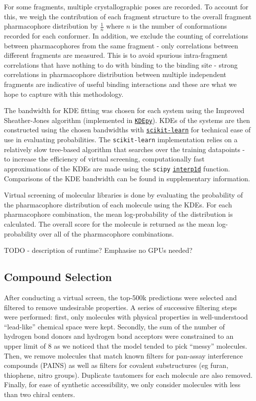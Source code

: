 \documentclass[journal=jacsat,manuscript=article]{achemso}
\begin{document}
For some fragments, multiple crystallographic poses are recorded. To account for this, we weigh the contribution of each fragment structure to the overall fragment pharmacophore distribution by $\frac{1}{n}$ where $n$ is the number of conformations recorded for each conformer. In addition, we exclude the counting of correlations between pharmacophores from the same fragment - only correlations between different fragments are measured. This is to avoid spurious intra-fragment correlations that have nothing to do with binding to the binding site - strong correlations in pharmacophore distribution between multiple independent fragments are indicative of useful binding interactions and these are what we hope to capture with this methodology.

The bandwidth for KDE fitting was chosen for each system using the Improved Sheather-Jones algorithm \cite{Botev2010ISJ} (implemented in \href{https://kdepy.readthedocs.io/en/latest/index.html}{\texttt{KDEpy}}). KDEs of the systems are then constructed using the chosen bandwidths with \href{https://scikit-learn.org/stable/}{\texttt{scikit-learn}} for technical ease of use in evaluating probabilities. The \texttt{scikit-learn} implementation relies on a relatively slow tree-based algorithm that searches over the training datapoints - to increase the efficiency of virtual screening, computationally fast approximations of the KDEs are made using the \texttt{scipy} \href{https://docs.scipy.org/doc/scipy/reference/generated/scipy.interpolate.interp1d.html#scipy.interpolate.interp1d}{\texttt{interp1d}} function. Comparisons of the KDE bandwidth can be found in supplementary information.

Virtual screening of molecular libraries is done by evaluating the probability of the pharmacophore distribution of each molecule using the KDEs. For each pharmacophore combination, the mean log-probability of the distribution is calculated. The overall score for the molecule is returned as the mean log-probability over all of the pharmacophore combinations.

TODO - description of runtime? Emphasise no GPUs needed?

\subsection{Compound Selection}
After conducting a virtual screen, the top-500k predictions were selected and filtered to remove undesirable properties. A series of successive filtering steps were performed: first, only molecules with physical properties in well-understood ``lead-like'' chemical space \cite{ChemSpace} were kept. Secondly, the sum of the number of hydrogen bond donors and hydrogen bond acceptors were constrained to an upper limit of 8 as we noticed that the model tended to pick ``messy'' molecules. Then, we remove molecules that match known filters for pan-assay interference compounds (PAINS) \cite{Baell2010Pains} as well as filters for covalent substructures (eg furan, thiophene, nitro groups). Duplicate tautomers for each molecule are also removed. Finally, for ease of synthetic accessibility, we only consider molecules with less than two chiral centers.
\end{document}
